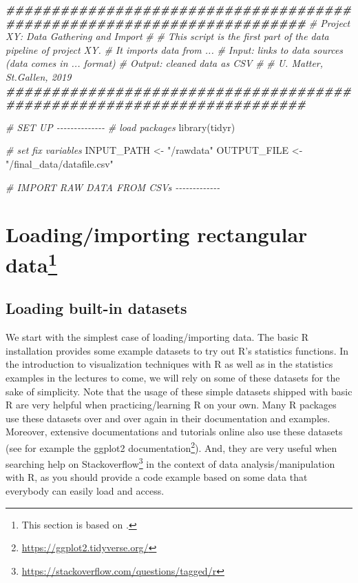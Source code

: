 \documentclass[
  12pt,
]{style/krantz}
\newenvironment{Shaded}{\begin{snugshade}}{\end{snugshade}}
\newcommand{\CommentTok}[1]{\textcolor[rgb]{0.56,0.35,0.01}{\textit{#1}}}
\newcommand{\DocumentationTok}[1]{\textcolor[rgb]{0.56,0.35,0.01}{\textbf{\textit{#1}}}}
\newcommand{\FunctionTok}[1]{\textcolor[rgb]{0.00,0.00,0.00}{#1}}
\newcommand{\NormalTok}[1]{#1}
\newcommand{\OtherTok}[1]{\textcolor[rgb]{0.56,0.35,0.01}{#1}}
\newcommand{\StringTok}[1]{\textcolor[rgb]{0.31,0.60,0.02}{#1}}
\renewcommand{\href}[2]{#2\footnote{\url{#1}}}
\begin{document}
\begin{Shaded}
\begin{Highlighting}[]
\DocumentationTok{\#\#\#\#\#\#\#\#\#\#\#\#\#\#\#\#\#\#\#\#\#\#\#\#\#\#\#\#\#\#\#\#\#\#\#\#\#\#\#\#\#\#\#\#\#\#\#\#\#\#\#\#\#\#\#\#\#\#\#\#\#\#\#\#\#\#\#\#\#\#\#}
\CommentTok{\# Project XY: Data Gathering and Import}
\CommentTok{\#}
\CommentTok{\# This script is the first part of the data pipeline of project XY.}
\CommentTok{\# It imports data from ...}
\CommentTok{\# Input: links to data sources (data comes in ... format)}
\CommentTok{\# Output: cleaned data as CSV}
\CommentTok{\# }
\CommentTok{\# U. Matter, St.Gallen, 2019}
\DocumentationTok{\#\#\#\#\#\#\#\#\#\#\#\#\#\#\#\#\#\#\#\#\#\#\#\#\#\#\#\#\#\#\#\#\#\#\#\#\#\#\#\#\#\#\#\#\#\#\#\#\#\#\#\#\#\#\#\#\#\#\#\#\#\#\#\#\#\#\#\#\#\#\#}


\CommentTok{\# SET UP {-}{-}{-}{-}{-}{-}{-}{-}{-}{-}{-}{-}{-}{-}}
\CommentTok{\# load packages}
\FunctionTok{library}\NormalTok{(tidyr)}

\CommentTok{\# set fix variables}
\NormalTok{INPUT\_PATH }\OtherTok{\textless{}{-}} \StringTok{"/rawdata"}
\NormalTok{OUTPUT\_FILE }\OtherTok{\textless{}{-}} \StringTok{"/final\_data/datafile.csv"}


\CommentTok{\# IMPORT RAW DATA FROM CSVs {-}{-}{-}{-}{-}{-}{-}{-}{-}{-}{-}{-}{-}}
\end{Highlighting}
\end{Shaded}

\hypertarget{loadingimporting-rectangular-data}{%
\section[Loading/importing rectangular data]{\texorpdfstring{Loading/importing rectangular data\footnote{This section is based on \citet{umatter_2018}.}}{Loading/importing rectangular data}}\label{loadingimporting-rectangular-data}}

\hypertarget{loading-built-in-datasets}{%
\subsection{Loading built-in datasets}\label{loading-built-in-datasets}}

We start with the simplest case of loading/importing data. The basic R installation provides some example datasets to try out R's statistics functions. In the introduction to visualization techniques with R as well as in the statistics examples in the lectures to come, we will rely on some of these datasets for the sake of simplicity. Note that the usage of these simple datasets shipped with basic R are very helpful when practicing/learning R on your own. Many R packages use these datasets over and over again in their documentation and examples. Moreover, extensive documentations and tutorials online also use these datasets (see for example the \href{https://ggplot2.tidyverse.org/}{ggplot2 documentation}). And, they are very useful when searching help on \href{https://stackoverflow.com/questions/tagged/r}{Stackoverflow} in the context of data analysis/manipulation with R, as you should provide a code example based on some data that everybody can easily load and access.
\end{document}
